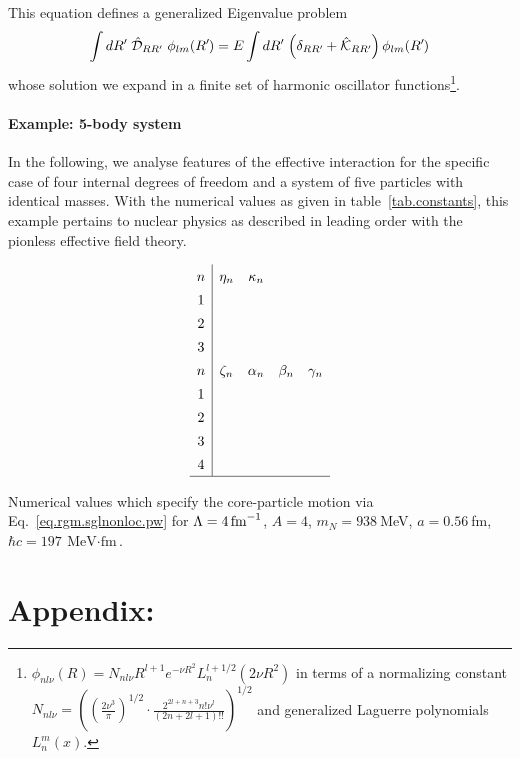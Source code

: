 \documentclass
[aps,nofootinbib,prl,showpacs,twocolumn,groupedaddress,superscriptaddress]
{revtex4}
\newcommand*{\mprime}{^{\prime}\mkern-1.2mu}
\newcommand{\la}{\label}
\newcommand{\be}{\begin{equation}}
\newcommand{\ee}{\end{equation}}
\newcommand{\lam}[1]{\mbox{\ensuremath{\Lambda=#1\,\text{fm}^{-1}}}}
\begin{document}
This equation defines a generalized Eigenvalue problem
\be\la{eq.rgm.gev}
\int dR\mprime~\hat{\mathcal{D}}_{RR\mprime}~\phi_{lm}(R\mprime)=
E\int dR\mprime\,\left(\delta_{RR\mprime}+\hat{\mathcal{K}}_{RR\mprime}\right)
\phi_{lm}(R\mprime)
\ee
whose solution we expand in a finite set of harmonic oscillator
functions\footnote{
$\phi_{nl\nu}(R)=N_{nl\nu}R^{l+1}e^{-\nu R^2}L_{n}^{l+1/2}(2\nu R^2)$
in terms of a normalizing constant $N_{nl\nu}=
\left(\left(\frac{2\nu^3}{\pi}\right)^{1/2}\cdot\frac{2^{2l+n+3}n!\nu^l}{(2n+2l+1)!!}\right)^{1/2}$ and generalized
Laguerre polynomials $L_n^m(x)$.
}.

\paragraph{Example: 5-body system}
In the following, we analyse features of the effective interaction for the
specific case of four internal degrees of freedom and a system of five particles
with identical masses. With the numerical values as given in table~\ref{tab.constants},
this example pertains to nuclear physics as described in leading order with the
pionless effective field theory.

\begin{table}
\be\la{tab.constants}
\setlength{\tabcolsep}{4pt}
\renewcommand{\arraystretch}{1.4}
\begin{array}{c|cccc}
n & \eta_n & \kappa_n & & \\
1 & & & & \\
2 & & & & \\
3 & & & & \\
n & \zeta_n & \alpha_n & \beta_n & \gamma_n \\
1 & & & & \\
2 & & & & \\
3 & & & & \\
4 & & & & \\
\hline
\end{array}
\ee
\caption{Numerical values which specify the core-particle motion via
Eq.~\eqref{eq.rgm.sglnonloc.pw} for $\lam{4}$, $A=4$, $m_N=938~$MeV, $a=0.56~$fm, $\hbar c=197~\text{MeV$\cdot$fm}$.}
\end{table}

\newpage





\section{Appendix: }
\end{document}
